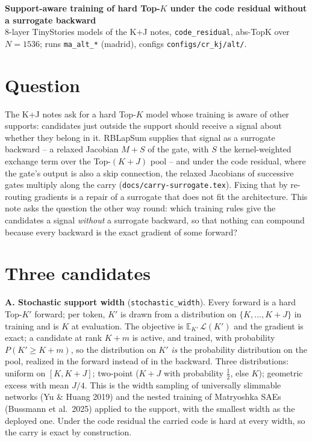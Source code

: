 \documentclass[10pt,a4paper]{article}
\newcommand{\code}[1]{\texttt{#1}}
\begin{document}
{\centering
{\large\bfseries Support-aware training of hard Top-$K$ under the code residual without a surrogate backward}\\[1pt]
{\small 8-layer TinyStories models of the K+J notes, \code{code\_residual}, abs-TopK over \(N=1536\); runs \code{ma\_alt\_*} (madrid), configs \code{configs/cr\_kj/alt/}.}\par}

\section{Question}
The K+J notes ask for a hard Top-\(K\) model whose training is aware of other supports: candidates just outside
the support should receive a signal about whether they belong in it.  RBLapSum supplies that signal as a surrogate
backward -- a relaxed Jacobian \(M+S\) of the gate, with \(S\) the kernel-weighted exchange term over the
Top-\((K{+}J)\) pool -- and under the code residual, where the gate's output is also a skip connection, the relaxed
Jacobians of successive gates multiply along the carry (\code{docs/carry-surrogate.tex}).  Fixing that by
re-routing gradients is a repair of a surrogate that does not fit the architecture.  This note asks the question
the other way round: which training rules give the candidates a signal \emph{without} a surrogate backward, so
that nothing can compound because every backward is the exact gradient of some forward?

\section{Three candidates}
\textbf{A. Stochastic support width} (\code{stochastic\_width}).  Every forward is a hard Top-\(K'\) forward; per
token, \(K'\) is drawn from a distribution on \(\{K,\dots,K{+}J\}\) in training and is \(K\) at evaluation.  The
objective is \(\mathbb E_{K'}\,\mathcal L(K')\) and the gradient is exact; a candidate at rank \(K{+}m\) is active,
and trained, with probability \(P(K'\ge K{+}m)\), so the distribution on \(K'\) \emph{is} the probability
distribution on the pool, realized in the forward instead of in the backward.  Three distributions: uniform on
\([K,K{+}J]\); two-point (\(K{+}J\) with probability \(\tfrac12\), else \(K\)); geometric excess with mean \(J/4\).
This is the width sampling of universally slimmable networks (Yu \& Huang 2019) and the nested training of
Matryoshka SAEs (Bussmann et al.\ 2025) applied to the support, with the smallest width as the deployed one.
Under the code residual the carried code is hard at every width, so the carry is exact by construction.
\end{document}
